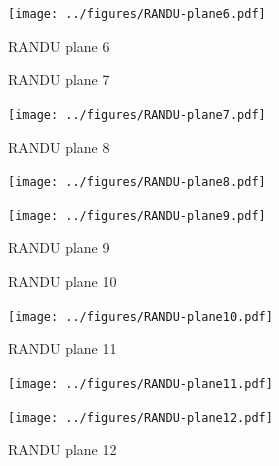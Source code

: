 \documentclass{article}
\begin{document}
\begin{enumerate}
\begin{enumerate}
\begin{figure}[H]
\begin{minipage}{.3\textwidth}
                        \caption{RANDU plane 6}
                        \texttt{[image: ../figures/RANDU-plane6.pdf]}
                    \end{minipage}
                \end{figure}
                \begin{figure}[H]
                    \centering
                    \begin{minipage}{.3\textwidth}
                        \centering
                        \caption{RANDU plane 7}
                        \texttt{[image: ../figures/RANDU-plane7.pdf]}
                    \end{minipage}
                    \begin{minipage}{.3\textwidth}
                        \centering
                        \caption{RANDU plane 8}
                        \texttt{[image: ../figures/RANDU-plane8.pdf]}
                    \end{minipage}
                    \begin{minipage}{.3\textwidth}
                        \centering
                        \caption{RANDU plane 9}
                        \texttt{[image: ../figures/RANDU-plane9.pdf]}
                    \end{minipage}
                \end{figure}
                \begin{figure}[H]
                    \centering
                    \begin{minipage}{.3\textwidth}
                        \centering
                        \caption{RANDU plane 10}
                        \texttt{[image: ../figures/RANDU-plane10.pdf]}
                    \end{minipage}
                    \begin{minipage}{.3\textwidth}
                        \centering
                        \caption{RANDU plane 11}
                        \texttt{[image: ../figures/RANDU-plane11.pdf]}
                    \end{minipage}
                    \begin{minipage}{.3\textwidth}
                        \centering
                        \caption{RANDU plane 12}
                        \texttt{[image: ../figures/RANDU-plane12.pdf]}
                    \end{minipage}
                \end{figure}
                \begin{figure}[H]

\end{figure}
\end{enumerate}
\end{enumerate}
\end{document}
